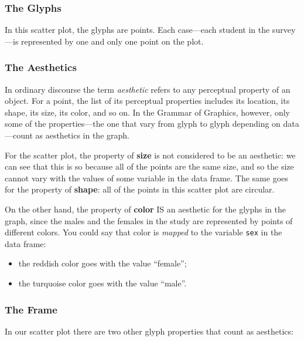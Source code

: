 \documentclass[]{book}
\providecommand{\tightlist}{%
  \setlength{\itemsep}{0pt}\setlength{\parskip}{0pt}}
\theoremstyle{definition}
\theoremstyle{definition}
\theoremstyle{definition}
\theoremstyle{remark}
\begin{document}
{\subsubsection{\texorpdfstring{The Glyphs
}{The Glyphs }}\label{the-glyphs}

In this scatter plot, the glyphs are points. Each case---each student in
the survey---is represented by one and only one point on the plot.

\subsubsection{\texorpdfstring{The Aesthetics
}{The Aesthetics }}\label{the-aesthetics}

In ordinary discourse the term \emph{aesthetic} refers to any perceptual
property of an object. For a point, the list of its perceptual
properties includes its location, its shape, its size, its color, and so
on. In the Grammar of Graphics, however, only some of the
properties---the one that vary from glyph to glyph depending on
data---count as aesthetics in the graph.

For the scatter plot, the property of \textbf{size} is not considered to
be an aesthetic: we can see that this is so because all of the points
are the same size, and so the size cannot vary with the values of some
variable in the data frame. The same goes for the property of
\textbf{shape}: all of the points in this scatter plot are circular.

On the other hand, the property of \textbf{color} IS an aesthetic for
the glyphs in the graph, since the males and the females in the study
are represented by points of different colors. You could say that color
is \emph{mapped} to the variable \texttt{sex} in the data frame:

\begin{itemize}
\tightlist
\item
  the reddish color goes with the value ``female'';
\item
  the turquoise color goes with the value ``male''.
\end{itemize}

\subsubsection{\texorpdfstring{The Frame
}{The Frame }}\label{the-frame}

In our scatter plot there are two other glyph properties that count as
aesthetics:

}
\end{document}
